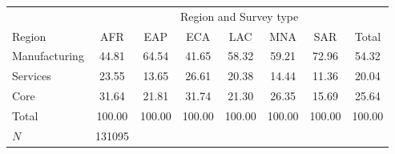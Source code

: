 {
\def\sym#1{\ifmmode^{#1}\else\(^{#1}\)\fi}
\begin{tabular}{l*{7}{c}}
\hline\hline
            &\multicolumn{7}{c}{Region and Survey type}                                                \\
Region      &         AFR&         EAP&         ECA&         LAC&         MNA&         SAR&       Total\\
\hline
Manufacturing&       44.81&       64.54&       41.65&       58.32&       59.21&       72.96&       54.32\\
Services    &       23.55&       13.65&       26.61&       20.38&       14.44&       11.36&       20.04\\
Core        &       31.64&       21.81&       31.74&       21.30&       26.35&       15.69&       25.64\\
Total       &      100.00&      100.00&      100.00&      100.00&      100.00&      100.00&      100.00\\
\hline
\(N\)       &      131095&            &            &            &            &            &            \\
\hline\hline
\end{tabular}
}
